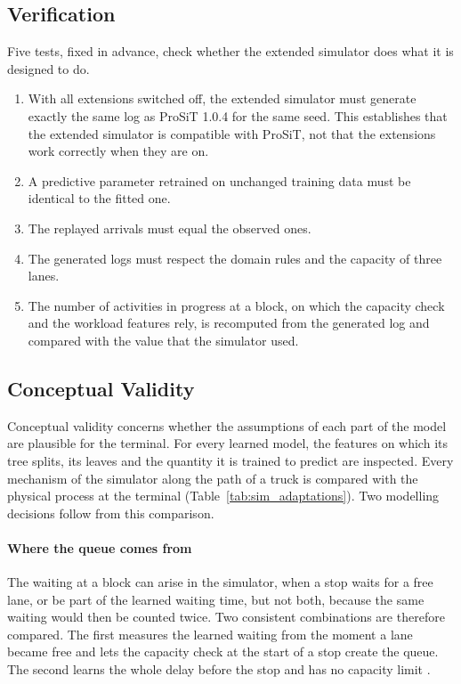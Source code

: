 \subsection{Verification}
\label{sec:exp_e4_verification}

Five tests, fixed in advance, check whether the extended simulator does what it is
designed to do.
\begin{enumerate}
\item With all extensions switched off, the extended simulator must generate exactly
the same log as ProSiT 1.0.4 for the same seed. This establishes that the extended
simulator is compatible with ProSiT, not that the extensions work correctly when
they are on.
\item A predictive parameter retrained on unchanged training data must be identical
to the fitted one.
\item The replayed arrivals must equal the observed ones.
\item The generated logs must respect the domain rules and the capacity of three
lanes.
\item The number of activities in progress at a block, on which the capacity check
and the workload features rely, is recomputed from the generated log and compared
with the value that the simulator used.
\end{enumerate}

\subsection{Conceptual Validity}
\label{sec:exp_e4_mechanisms}

Conceptual validity concerns whether the assumptions of each part of the model are
plausible for the terminal. For every learned model, the features on which its tree
splits, its leaves and the quantity it is trained to predict are inspected. Every
mechanism of the simulator along the path of a truck is compared with the physical
process at the terminal (Table~\ref{tab:sim_adaptations}). Two modelling decisions
follow from this comparison.

\paragraph{Where the queue comes from} The waiting at a block can arise in the
simulator, when a stop waits for a free lane, or be part of the learned waiting
time, but not both, because the same waiting would then be counted twice. Two
consistent combinations are therefore compared. The first measures the learned
waiting from the moment a lane became free and lets the capacity check at the start
of a stop create the queue. The second learns the whole delay before the stop and
has no capacity limit \cite{RWChapela2024Delays}.


